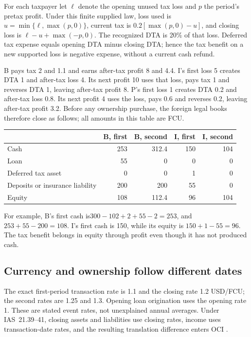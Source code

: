 For each taxpayer let \(\ell\) denote the opening unused tax loss and \(p\)
the period's pretax profit. Under this finite supplied law, loss used is
\(u=\min\{\ell,\max(p,0)\}\), current tax is
\(0.2[\max(p,0)-u]\), and closing loss is
\(\ell-u+\max(-p,0)\). The recognized DTA is 20\% of that loss. Deferred
tax expense equals opening DTA minus closing DTA; hence the tax benefit on a
new supported loss is negative expense, without a current cash refund.

B pays tax 2 and 1.1 and earns after-tax profit 8 and 4.4. I's first loss 5 creates
DTA 1 and after-tax loss 4. Its next profit 10 uses that loss, pays tax 1 and
reverses DTA 1, leaving after-tax profit 8. P's first loss 1 creates DTA 0.2 and
after-tax loss 0.8. Its next profit 4 uses the loss, pays 0.6 and reverses 0.2,
leaving after-tax profit 3.2. Before any ownership purchase, the foreign legal
books therefore close as follows; all amounts in this table are FCU.

\begin{center}
\begin{tabular}{lrrrr}
\toprule & B, first & B, second & I, first & I, second\\\midrule
Cash &253&312.4&150&104\\
Loan &55&0&0&0\\
Deferred tax asset &0&0&1&0\\
Deposits or insurance liability &200&200&55&0\\
Equity &108&112.4&96&104\\\bottomrule
\end{tabular}
\end{center}
For example, B's first cash is\(300-102+2+55-2=253\), and
\(253+55-200=108\). I's first cash is 150, while its equity is
\(150+1-55=96\). The tax benefit belongs in equity through profit even
though it has not produced cash.

\subsection{Currency and ownership follow different dates}

The exact first-period transaction rate is 1.1 and the closing rate 1.2 USD/FCU;
the second rates are 1.25 and 1.3. Opening loan origination uses the opening
rate 1. These are stated event rates, not unexplained annual averages. Under
IAS~21.39--41, closing assets and liabilities use closing rates, income uses
transaction-date rates, and the resulting translation difference enters OCI
\citep{eu 20231803}.

